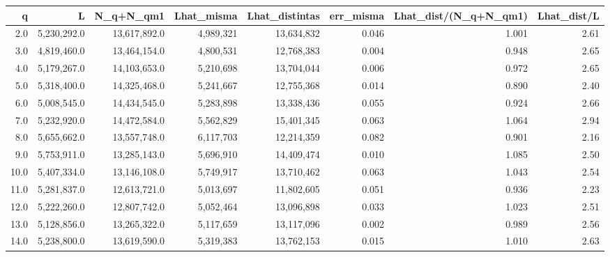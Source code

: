 \begin{tabular}{rrrrrrrr}
\toprule
q & L & N\_q+N\_qm1 & Lhat\_misma & Lhat\_distintas & err\_misma & Lhat\_dist/(N\_q+N\_qm1) & Lhat\_dist/L \\
\midrule
2.0 & 5,230,292.0 & 13,617,892.0 & 4,989,321 & 13,634,832 & 0.046 & 1.001 & 2.61 \\
3.0 & 4,819,460.0 & 13,464,154.0 & 4,800,531 & 12,768,383 & 0.004 & 0.948 & 2.65 \\
4.0 & 5,179,267.0 & 14,103,653.0 & 5,210,698 & 13,704,044 & 0.006 & 0.972 & 2.65 \\
5.0 & 5,318,400.0 & 14,325,468.0 & 5,241,667 & 12,755,368 & 0.014 & 0.890 & 2.40 \\
6.0 & 5,008,545.0 & 14,434,545.0 & 5,283,898 & 13,338,436 & 0.055 & 0.924 & 2.66 \\
7.0 & 5,232,920.0 & 14,472,584.0 & 5,562,829 & 15,401,345 & 0.063 & 1.064 & 2.94 \\
8.0 & 5,655,662.0 & 13,557,748.0 & 6,117,703 & 12,214,359 & 0.082 & 0.901 & 2.16 \\
9.0 & 5,753,911.0 & 13,285,143.0 & 5,696,910 & 14,409,474 & 0.010 & 1.085 & 2.50 \\
10.0 & 5,407,334.0 & 13,146,108.0 & 5,749,917 & 13,710,462 & 0.063 & 1.043 & 2.54 \\
11.0 & 5,281,837.0 & 12,613,721.0 & 5,013,697 & 11,802,605 & 0.051 & 0.936 & 2.23 \\
12.0 & 5,222,260.0 & 12,807,742.0 & 5,052,464 & 13,096,898 & 0.033 & 1.023 & 2.51 \\
13.0 & 5,128,856.0 & 13,265,322.0 & 5,117,659 & 13,117,096 & 0.002 & 0.989 & 2.56 \\
14.0 & 5,238,800.0 & 13,619,590.0 & 5,319,383 & 13,762,153 & 0.015 & 1.010 & 2.63 \\
\bottomrule
\end{tabular}
